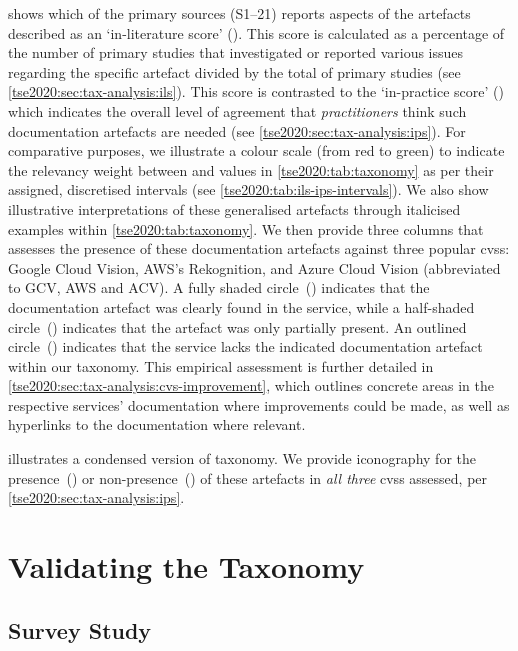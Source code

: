  shows which of the primary sources (S1--21) reports aspects of the artefacts described as an `in-literature score' (). This score is calculated as a percentage of the number of primary studies that investigated or reported various issues regarding the specific artefact divided by the total of primary studies (see \cref{tse2020:sec:tax-analysis:ils}). This score is contrasted to the `in-practice score' () which indicates the overall level of agreement that \textit{practitioners} think such documentation artefacts are needed (see \cref{tse2020:sec:tax-analysis:ips}).
For comparative purposes, we illustrate a colour scale (from red to green) to indicate the relevancy weight between  and  values in \cref{tse2020:tab:taxonomy} as per their assigned, discretised intervals (see \cref{tse2020:tab:ils-ips-intervals}). We also show illustrative interpretations of these generalised artefacts through italicised examples within \cref{tse2020:tab:taxonomy}.
We then provide three columns that assesses the presence of these documentation artefacts against three popular \glspl{cvs}: Google Cloud Vision, AWS's Rekognition, and Azure Cloud Vision (abbreviated to GCV, AWS and ACV). A fully shaded circle~(\circlepresent{}) indicates that the documentation artefact was clearly found in the service, while a half-shaded circle~(\circlepartialpresent{}) indicates that the artefact was only partially present. An outlined circle~(\circlenotpresent{}) indicates that the service lacks the indicated documentation artefact within our taxonomy. This empirical assessment is further detailed in \cref{tse2020:sec:tax-analysis:cvs-improvement}, which outlines concrete areas in the respective services' documentation where improvements could be made, as well as hyperlinks to the documentation where relevant.

 illustrates a condensed version of taxonomy.
We provide iconography for the presence~(\faCheckCircle) or non-presence~(\faTimesCircle) of these   artefacts in \textit{all three} \glspl{cvs} assessed, per \cref{tse2020:sec:tax-analysis:ips}.



\section{Validating the Taxonomy}
\label{tse2020:sec:validation}

\subsection{Survey Study}
\label{tse2020:sec:validation:survey}

